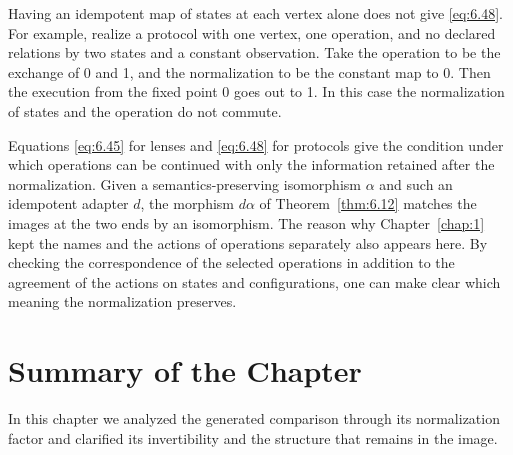Having an idempotent map of states at each vertex alone does not give \eqref{eq:6.48}.
For example, realize a protocol with one vertex, one operation, and no declared relations
by two states and a constant observation.
Take the operation to be the exchange of 0 and 1, and the normalization to be the constant
map to 0.
Then the execution from the fixed point 0 goes out to 1.
In this case the normalization of states and the operation do not commute.

Equations \eqref{eq:6.45} for lenses and \eqref{eq:6.48} for protocols give the condition
under which operations can be continued with only the information retained after the
normalization.
Given a semantics-preserving isomorphism $\alpha$ and such an idempotent adapter $d$, the
morphism $d\alpha$ of Theorem~\ref{thm:6.12} matches the images at the two ends by an
isomorphism.
The reason why Chapter~\ref{chap:1} kept the names and the actions of operations separately
also appears here.
By checking the correspondence of the selected operations in addition to the agreement of
the actions on states and configurations, one can make clear which meaning the
normalization preserves.

\section*{Summary of the Chapter}

In this chapter we analyzed the generated comparison through its normalization factor and
clarified its invertibility and the structure that remains in the image.

